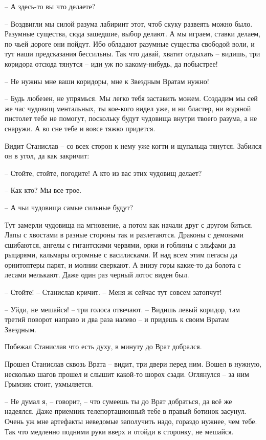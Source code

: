 \documentclass[ebook,oneside,final,openright]{memoir}
\begin{document}
– А здесь-то вы что делаете?\par
– Воздвигли мы силой разума лабиринт этот, чтоб скуку развеять можно было. Разумные существа, сюда зашедшие, выбор делают. А мы играем, ставки делаем, по чьей дороге они пойдут. Ибо обладают разумные существа свободой воли, и тут наши предсказания бессильны. Так что давай, хватит отдыхать – видишь, три коридора отсюда тянутся – иди уж по какому-нибудь, да побыстрее!\par
– Не нужны мне ваши коридоры, мне к Звездным Вратам нужно!\par
– Будь любезен, не упрямься. Мы легко тебя заставить можем. Создадим мы сей же час чудовищ ментальных, ты кое-кого видел уже, и ни бластер, ни водяной пистолет тебе не помогут, поскольку будут чудовища внутри твоего разума, а не снаружи. А во сне тебе и вовсе тяжко придется.\par
\par
Видит Станислав – со всех сторон к нему уже когти и щупальца тянутся. Забился он в угол, да как закричит:\par
– Стойте, стойте, погодите! А кто из вас этих чудовищ делает?\par
– Как кто? Мы все трое.\par
– А чьи чудовища самые сильные будут?\par
Тут замерли чудовища на мгновение, а потом как начали друг с другом биться. Лапы с хвостами в разные стороны так и разлетаются. Драконы с демонами сшибаются, ангелы с гигантскими червями, орки и гоблины с эльфами да рыцарями, кальмары огромные с василисками. И над всем этим пегасы да орнитоптеры парят, и молнии сверкают. А внизу горы какие-то да болота с лесами мелькают. Даже один раз черный лотос виден был. \par
– Стойте! – Станислав кричит. – Меня ж сейчас тут совсем затопчут!\par
– Уйди, не мешайся! – три голоса отвечают. – Видишь левый коридор, там третий поворот направо и два раза налево – и придешь к своим Вратам Звездным.\par
\par
Побежал Станислав что есть духу, в минуту до Врат добрался.\par
\par
Прошел Станислав сквозь Врата – видит, три двери перед ним. Вошел в нужную, несколько шагов прошел и слышит какой-то шорох сзади. Оглянулся – за ним Грымзик стоит, ухмыляется. \par
\par
– Не думал я, – говорит, – что сумеешь ты до Врат добраться, да всё же надеялся. Даже приемник телепортационный тебе в правый ботинок засунул. Очень уж мне артефакты неведомые заполучить надо, гораздо нужнее, чем тебе. Так что медленно подними руки вверх и отойди в сторонку, не мешайся.\par
\end{document}
